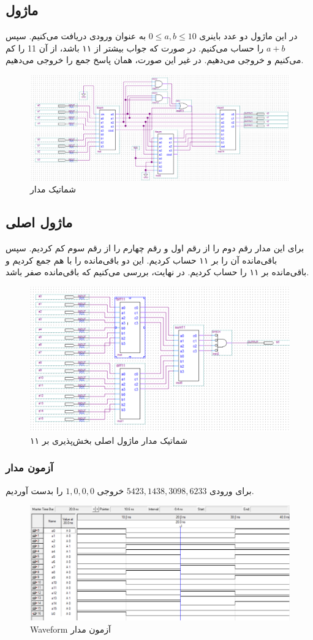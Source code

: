 \documentclass{perassignments}
\begin{document}
	 	\subsection{ماژول }
	 در این ماژول دو عدد باینری 
	 \(0\leq a,b \leq 10\)
	 به عنوان ورودی دریافت می‌کنیم. سپس 
	 \(a + b\)
	 را حساب می‌کنیم. در صورت که جواب بیشتر از ۱۱ باشد، از آن
	 11
	 را کم می‌کنیم و خروجی می‌دهیم. در غیر این صورت، همان پاسخ جمع را خروجی می‌دهیم.
	 \begin{figure}[H]
	 	\centering
	 	\includegraphics[width = 0.8 \textwidth]{graphics/sum11.png}
	 	\caption{شماتیک مدار }
	 \end{figure}
	 	 	\subsection{ماژول اصلی}
	 برای این مدار رقم‌ دوم را از رقم اول و رقم چهارم را از رقم سوم کم کردیم. سپس باقی‌مانده آن را بر ۱۱ حساب کردیم. این دو باقی‌مانده را با هم جمع کردیم و باقی‌مانده بر ۱۱ را حساب کردیم. در نهایت، بررسی می‌کنیم که باقی‌مانده صفر باشد.
	 \begin{figure}[H]
	 	\centering
	 	\includegraphics[width = 0.8 \textwidth]{graphics/lab11.png}
	 	\caption{شماتیک مدار ماژول اصلی بخش‌پذیری بر ۱۱}
	 \end{figure}
	 \subsubsection{آزمون مدار}
	 برای ورودی 
	 \(5423,1438,3098,6233\)
	 خروجی 
	 \(1,0,0,0\)
	 را بدست آوردیم.
	 \begin{figure}[H]
	 	\centering
	 	\includegraphics[width = 0.8 \textwidth]{graphics/waveform11.png}
	 	\caption{Waveform آزمون مدار}
	 \end{figure}
\end{document}
